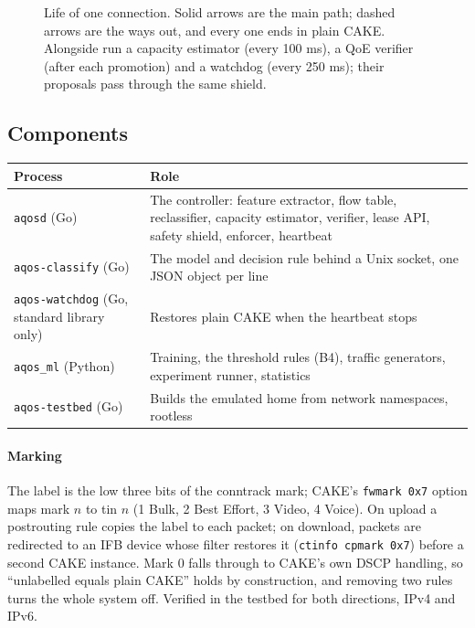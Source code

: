 \documentclass[11pt,a4paper]{article}
\begin{document}
\begin{figure}[H]
\caption{Life of one connection. Solid arrows are the main path; dashed arrows are the ways out, and every one ends in plain CAKE. Alongside run a capacity estimator (every 100 ms), a QoE verifier (after each promotion) and a watchdog (every 250 ms); their proposals pass through the same shield.}
\label{fig:flow}
\end{figure}

\subsection{Components}

\begin{table}[H]\centering\small
\begin{tabularx}{\linewidth}{@{}l>{\raggedright\arraybackslash}X@{}}
\toprule
Process & Role \\
\midrule
\texttt{aqosd} (Go) & The controller: feature extractor, flow table, reclassifier, capacity estimator, verifier, lease API, safety shield, enforcer, heartbeat \\
\texttt{aqos-classify} (Go) & The model and decision rule behind a Unix socket, one JSON object per line \\
\texttt{aqos-watchdog} (Go, standard library only) & Restores plain CAKE when the heartbeat stops \\
\texttt{aqos\_ml} (Python) & Training, the threshold rules (B4), traffic generators, experiment runner, statistics \\
\texttt{aqos-testbed} (Go) & Builds the emulated home from network namespaces, rootless \\
\bottomrule
\end{tabularx}
\end{table}

\paragraph{Marking} The label is the low three bits of the conntrack mark; CAKE's \texttt{fwmark 0x7} option maps mark $n$ to tin $n$ (1 Bulk, 2 Best Effort, 3 Video, 4 Voice). On upload a postrouting rule copies the label to each packet; on download, packets are redirected to an IFB device whose filter restores it (\texttt{ctinfo cpmark 0x7}) before a second CAKE instance. Mark 0 falls through to CAKE's own DSCP handling, so ``unlabelled equals plain CAKE'' holds by construction, and removing two rules turns the whole system off. Verified in the testbed for both directions, IPv4 and IPv6.
\end{document}
